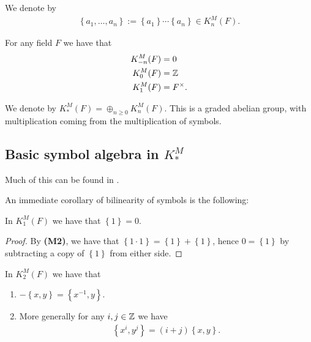 \documentclass[11pt,openany]{book}
\begin{document}
\begin{notation} We denote by
\begin{align*}
    \left\{ a_1, \ldots, a_n \right\} := \left\{ a_1 \right\} \cdots \left\{ a_n \right\}\in K_n^M(F).
\end{align*}
\end{notation}

\begin{proposition} For any field $F$ we have that
\begin{align*}
    K^M_{-n}(F) &= 0 \\
    K^M_0(F) &= \mathbb{Z} \\
    K^M_{1}(F) &= F^\times.
\end{align*}
\end{proposition}

\begin{notation} We denote by $K_\ast^M(F) = \oplus_{n\ge0} K_n^M(F)$. This is a graded abelian group, with multiplication coming from the multiplication of symbols.
\end{notation}


\subsection{Basic symbol algebra in $K_\ast^M$}

Much of this can be found in \cite[\S7.1]{GS}.


An immediate corollary of bilinearity of symbols is the following:

\begin{proposition} In $K_1^M(F)$ we have that $\left\{ 1 \right\} = 0$.
\end{proposition}
\begin{proof} By \textbf{(M2)}, we have that $\left\{ 1\cdot 1 \right\} = \left\{ 1 \right\} + \left\{ 1 \right\}$, hence $0 = \left\{ 1 \right\}$ by subtracting a copy of $\left\{ 1 \right\}$ from either side.
\end{proof}

\begin{proposition}\label{prop:powers-symbols} 
In $K_2^M(F)$ we have that
\begin{enumerate}
    \item $-\left\{ x,y \right\} = \left\{ x^{-1},y \right\}$.
    \item More generally for any $i,j\in \mathbb{Z}$ we have
    \begin{align*}
         \left\{ x^i,y^j \right\} = (i+j) \left\{ x,y \right\}.
    \end{align*}
\end{enumerate}
\end{proposition}
\end{document}
